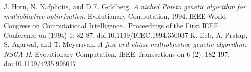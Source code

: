 \documentclass[onecolumn]{article}
\begin{document}
\begin{multicols}{2}
\begin{thebibliography}{9}
		J. Horn, N. Nafpliotis, and D.E. Goldberg. \emph{A niched Pareto genetic algorithm for multiobjective optimization}. Evolutionary Computation, 1994. IEEE World Congress on Computational Intelligence., Proceedings of the First IEEE Conference on (1994) 1: 82-87. doi:10.1109/ICEC.1994.350037
		K. Deb, A. Pratap, S. Agarwal, and T. Meyarivan. \emph{A fast and elitist multiobjective genetic algorithm: NSGA-II}. Evolutionary Computation, IEEE Transactions on 6 (2): 182-197. doi:10.1109/4235.996017


\end{thebibliography}
\end{multicols}
\end{document}
